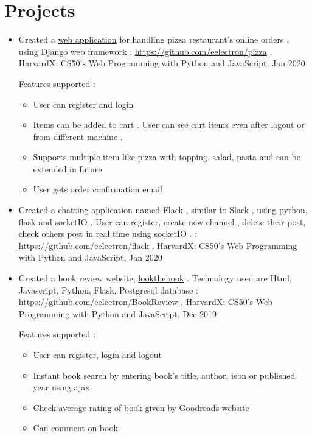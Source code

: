 \documentclass[a4paper,10pt]{article}
\begin{document}
	\section{Projects}
	\begin{itemize}
				
				\item Created a \href{https://pizzacs50w.herokuapp.com/}{web application} for handling pizza restaurant's online orders , using Django web framework : \url{https://github.com/eelectron/pizza} , HarvardX: CS50's Web Programming with Python and JavaScript, Jan 2020
					
					Features supported :
					\begin{itemize}
						\item User can register and login
						\item Items can be added to cart . User can see cart items even after logout or from different machine .
						\item Supports multiple item like pizza with topping, salad, pasta and can be extended in future
						\item User gets order confirmation email
					\end{itemize}
					
				\item Created a chatting application named \href{https://flackthechat.herokuapp.com}{Flack} , similar to Slack , using python, flask and socketIO . User can register, create new channel , delete their post, check others post in real time using socketIO . : \url{https://github.com/eelectron/flack} , HarvardX: CS50's Web Programming with Python and JavaScript, Jan 2020
				
				\item Created a book review website, \href{http://lookthebook.herokuapp.com}{lookthebook} . Technology used are Html, Javascript, Python, Flask, Postgresql database : \url{https://github.com/eelectron/BookReview}  , HarvardX: CS50's Web Programming with Python and JavaScript, Dec 2019
				
				Features supported :
				\begin{itemize}
					\item User can register, login and logout
					\item Instant book search by entering book's title, author, isbn or published year using ajax
					\item Check average rating of book given by Goodreads website
					\item Can comment  on book 
				\end{itemize}
				

\end{itemize}
\end{document}
